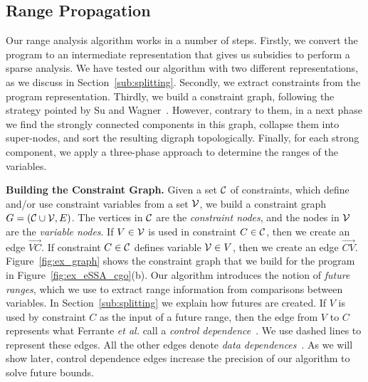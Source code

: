 \documentclass{sigplanconf}[10pt]
\newcommand{\varset}[1]{\mbox{$\cal{#1}$}}
\begin{document}
\subsection{Range Propagation}
\label{sub:prop}

Our range analysis algorithm works in a number of steps.
Firstly, we convert the program to an intermediate representation that gives
us subsidies to perform a sparse analysis.
We have tested our algorithm with two different representations, as we discuss
in Section~\ref{sub:splitting}.
Secondly, we extract constraints from the program representation.
Thirdly, we build a constraint graph, following the strategy pointed by
Su and Wagner~\cite{Su05}.
However, contrary to them, in a next phase we find the strongly connected
components in this graph, collapse them into super-nodes, and sort the
resulting digraph topologically.
Finally, for each strong component, we apply a three-phase approach to determine
the ranges of the variables.

\noindent
\textbf{Building the Constraint Graph. }
Given a set $\varset{C}$ of constraints, which define and/or use constraint
variables from a set $\varset{V}$, we build a constraint graph
$G = (\varset{C} \cup \varset{V}, E)$.
The vertices in \varset{C} are the {\em constraint nodes}, and the
nodes in \varset{V} are the {\em variable nodes}.
If $V \in \varset{V}$ is used in constraint $C \in \varset{C}$, then
we create an edge $\overrightarrow{VC}$.
If constraint $C \in \varset{C}$ defines variable $\varset{V} \in V$, then we
create an edge $\overrightarrow{CV}$.
Figure~\ref{fig:ex_graph} shows the constraint graph that we build for the
program in Figure~\ref{fig:ex_eSSA_cgo}(b).
Our algorithm introduces the notion of {\em future ranges}, which we use to extract
range information from comparisons between variables.
In Section~\ref{sub:splitting} we explain how futures are created.
If $V$ is used by constraint $C$ as the input of a future range, then the edge
from $V$ to $C$ represents what Ferrante {\em et al.} call a {\em control
dependence}~\cite[p.323]{Ferrante87}.
We use dashed lines to represent these edges.
All the other edges denote {\em data dependences}~\cite[p.322]{Ferrante87}.
As we will show later, control dependence edges increase the precision of our
algorithm to solve future bounds.
\end{document}
